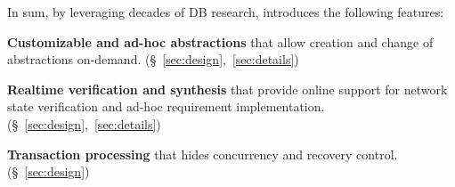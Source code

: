 
In sum, by leveraging decades of DB research, \Sys introduces
the following features:




\vspace{-1.5mm}
\begin{compactList}
\item \textbf{Customizable and ad-hoc abstractions} that allow creation
and change of abstractions
on-demand. (\S~\ref{sec:design},~\ref{sec:details})
\vspace{-1.5mm}
\item \textbf{Realtime verification and synthesis} 
that provide online support for network state verification and ad-hoc
requirement implementation. (\S~\ref{sec:design},~\ref{sec:details})
\vspace{-1.5mm}
\item \textbf{Transaction processing} that hides concurrency and recovery
control. (\S~\ref{sec:design})

\end{compactList}